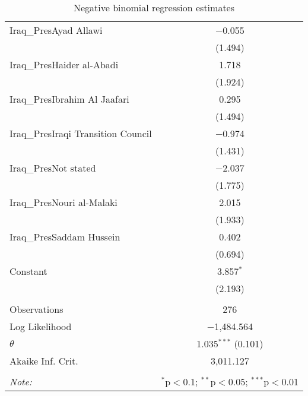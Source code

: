 \begin{table}[ht]
\begin{adjustbox}{width=1\textwidth}
\begin{tabular}{@{\extracolsep{5pt}}lc}
 Iraq\_PresAyad Allawi & $-$0.055 \\ 
  & (1.494) \\ 
 Iraq\_PresHaider al-Abadi & 1.718 \\ 
  & (1.924) \\ 
 Iraq\_PresIbrahim Al Jaafari & 0.295 \\ 
  & (1.494) \\ 
 Iraq\_PresIraqi Transition Council & $-$0.974 \\ 
  & (1.431) \\ 
 Iraq\_PresNot stated & $-$2.037 \\ 
  & (1.775) \\ 
 Iraq\_PresNouri al-Malaki & 2.015 \\ 
  & (1.933) \\ 
 Iraq\_PresSaddam Hussein & 0.402 \\ 
  & (0.694) \\ 
 Constant & 3.857$^{*}$ \\ 
  & (2.193) \\ 
\hline \\[-1.8ex] 
Observations & 276 \\ 
Log Likelihood & $-$1,484.564 \\ 
$\theta$ & 1.035$^{***}$  (0.101) \\ 
Akaike Inf. Crit. & 3,011.127 \\ 
\hline 
\hline \\[-1.8ex] 
\textit{Note:}  & \multicolumn{1}{r}{$^{*}$p$<$0.1; $^{**}$p$<$0.05; $^{***}$p$<$0.01} \ 
\end{tabular}
\end{adjustbox}
\caption{Negative binomial regression estimates} 
\end{table} 


